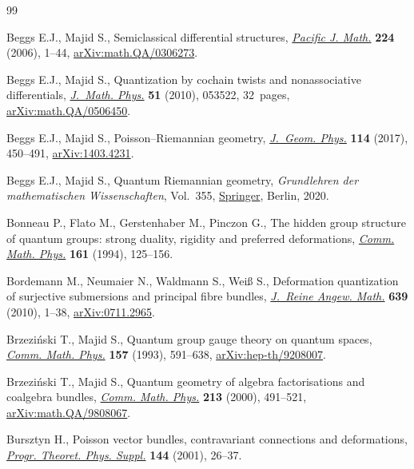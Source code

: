 \begin{thebibliography}{99}
\footnotesize\itemsep=-1pt

Beggs E.J., Majid S., Semiclassical differential structures, \href{https://doi.org/10.2140/pjm.2006.224.1}{\textit{Pacific J.
 Math.}} \textbf{224} (2006), 1--44, \href{https://arxiv.org/abs/math.QA/0306273}{arXiv:math.QA/0306273}.

Beggs E.J., Majid S., Quantization by cochain twists and nonassociative
 differentials, \href{https://doi.org/10.1063/1.3371677}{\textit{J.~Math. Phys.}} \textbf{51} (2010), 053522, 32~pages,
 \href{https://arxiv.org/abs/math.QA/0506450}{arXiv:math.QA/0506450}.

Beggs E.J., Majid S., Poisson--{R}iemannian geometry, \href{https://doi.org/10.1016/j.geomphys.2016.12.012}{\textit{J.~Geom. Phys.}}
 \textbf{114} (2017), 450--491, \href{https://arxiv.org/abs/1403.4231}{arXiv:1403.4231}.

Beggs E.J., Majid S., Quantum {R}iemannian geometry, \textit{Grundlehren der
 mathematischen Wissenschaften}, Vol.~355, \href{https://doi.org/10.1007/978-3-030-30294-8}{Springer}, Berlin, 2020.

Bonneau P., Flato M., Gerstenhaber M., Pinczon G., The hidden group structure
 of quantum groups: strong duality, rigidity and preferred deformations,
 \href{https://doi.org/10.1007/BF02099415}{\textit{Comm. Math. Phys.}} \textbf{161} (1994), 125--156.

Bordemann M., Neumaier N., Waldmann S., Wei{\ss} S., Deformation quantization
 of surjective submersions and principal fibre bundles, \href{https://doi.org/10.1515/CRELLE.2010.009}{\textit{J.~Reine
 Angew. Math.}} \textbf{639} (2010), 1--38, \href{https://arxiv.org/abs/0711.2965}{arXiv:0711.2965}.

Brzezi\'nski T., Majid S., Quantum group gauge theory on quantum spaces,
 \href{https://doi.org/10.1007/BF02096884}{\textit{Comm. Math. Phys.}} \textbf{157} (1993), 591--638,
 \href{https://arxiv.org/abs/hep-th/9208007}{arXiv:hep-th/9208007}.

Brzezi\'nski T., Majid S., Quantum geometry of algebra factorisations and
 coalgebra bundles, \href{https://doi.org/10.1007/PL00005530}{\textit{Comm. Math. Phys.}} \textbf{213} (2000), 491--521,
 \href{https://arxiv.org/abs/math.QA/9808067}{arXiv:math.QA/9808067}.

Bursztyn H., Poisson vector bundles, contravariant connections and
 deformations, \href{https://doi.org/10.1143/PTPS.144.26}{\textit{Progr. Theoret. Phys. Suppl.}} \textbf{144} (2001),
 26--37.


\end{thebibliography}
